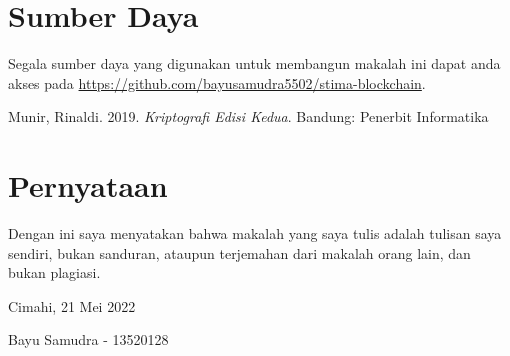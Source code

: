 \documentclass[10pt,conference]{IEEEtran}
\theoremstyle{definition}
\begin{document}
\section*{Sumber Daya}
Segala sumber daya yang digunakan untuk membangun makalah ini dapat anda akses pada \url{https://github.com/bayusamudra5502/stima-blockchain}.


\begin{thebibliography}{00}
 Munir, Rinaldi. 2019. \emph{Kriptografi Edisi Kedua}. Bandung: Penerbit Informatika 
\end{thebibliography}

\section*{Pernyataan}
Dengan ini saya menyatakan bahwa makalah yang saya tulis adalah tulisan saya sendiri, bukan sanduran, ataupun terjemahan dari makalah orang lain, dan bukan plagiasi.


\vspace{20px}
\hspace*{\fill} Cimahi, 21 Mei 2022

\vspace{50px}
\hspace*{\fill} Bayu Samudra - 13520128
\end{document}

